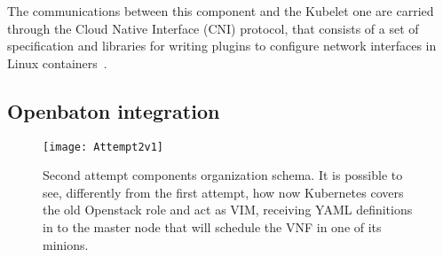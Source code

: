 \begin{description}
  The communications between this component and the Kubelet one are carried
  through the Cloud Native Interface (CNI) protocol, that consists of a set
  of specification and libraries for writing plugins to configure network
  interfaces in Linux containers~\cite{cnigithub}.
\end{description}

\subsection{Openbaton integration}

\begin{figure}[t]
  \centering
  \texttt{[image: Attempt2v1]}
  \caption[Second attempt components organization schema]{Second attempt
    components organization schema. It is possible to see, differently from the
    first attempt, how now Kubernetes covers the old Openstack role and act as
    VIM, receiving YAML definitions in to the master node that will schedule the
    VNF in one of its minions.}
  \label{chap:archimpl:sec:secondattempt:img:schema1}
\end{figure}

